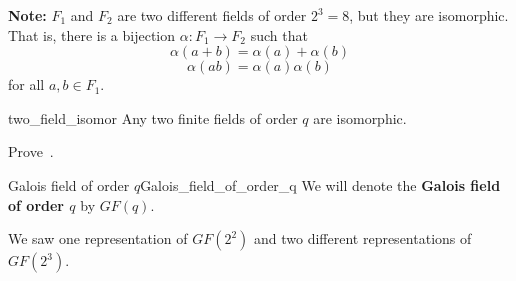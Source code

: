 \textbf{Note:} $ F_1 $ and $ F_2 $ are two different fields of order $ 2^3=8 $,
but they are isomorphic. That is,
there is a bijection $ \alpha : F_1\rightarrow F_2 $ such that
\[ \alpha(a+b)=\alpha(a)+\alpha(b) \]
\[ \alpha(ab)=\alpha(a)\alpha(b) \]
for all $ a,b\in F_1 $.

\begin{Theorem}{}{two_field_isomor}
    Any two finite fields of order $ q $ are isomorphic.
\end{Theorem}

\begin{Exercise}{}{}
    Prove~.
\end{Exercise}

\begin{Definition}{Galois field of order $ q $}{Galois_field_of_order_q}
    We will denote the \textbf{Galois field of order $ q $} by $ GF(q) $.
\end{Definition}

We saw one representation of $ GF(2^2) $
and two different representations of $ GF(2^3) $.
